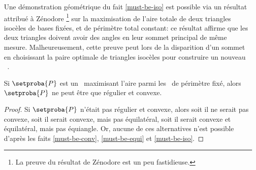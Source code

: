 %


\begin{remark}
    Une démonstration géométrique du fait \ref{must-be-iso} est possible via un résultat attribué à Zénodore%
    \footnote{
        La preuve du résultat de Zénodore est un peu fastidieuse.
    }
    sur la maximisation de l'aire totale de deux triangles isocèles de bases fixées, et de périmètre total constant:
    ce résultat affirme que les deux triangles doivent avoir des angles en leur sommet principal de même mesure.
    Malheureusement, cette preuve peut  lors de la disparition d'un sommet en choisissant la paire optimale de triangles isocèles pour construire un nouveau \ngone\ .
\end{remark}




\begin{fact} \label{must-be-reg}
    Si $\setproba{P}$ est un \ngone\ maximisant l'aire parmi les \ngones\ de périmètre fixé, alors $\setproba{P}$ ne peut être que régulier et convexe.
\end{fact}


\begin{proof}
    Si $\setproba{P}$ n'était pas régulier et convexe, alors
    soit il ne serait pas convexe,
    soit il serait convexe, mais pas équilatéral,
    soit il serait convexe et équilatéral, mais pas équiangle.
    Or, aucune de ces alternatives n'est possible d'après les faits \ref{must-be-conv}, \ref{must-be-equi} et \ref{must-be-iso}.
\end{proof}



